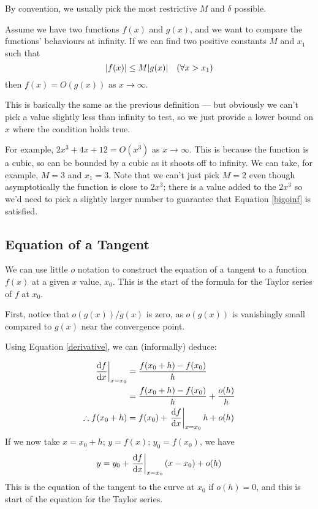 By convention, we usually pick the most restrictive \(M\) and \(\delta\) possible.

\begin{definition}
	Assume we have two functions \(f(x)\) and \(g(x)\), and we want to compare the functions' behaviours at infinity.
	If we can find two positive constants \(M\) and \(x_1\) such that
	\begin{equation}\label{bigoinf}
		\abs{f(x)} \leq M\abs{g(x)} \quad(\forall x > x_1)
	\end{equation}
	then \(f(x) = O(g(x))\) as \(x \to \infty\).
\end{definition}

This is basically the same as the previous definition --- but obviously we can't pick a value slightly less than infinity to test, so we just provide a lower bound on \(x\) where the condition holds true.

For example, \(2x^3 + 4x + 12 = O(x^3)\) as \(x \to \infty\).
This is because the function is a cubic, so can be bounded by a cubic as it shoots off to infinity.
We can take, for example, \(M = 3\) and \(x_1 = 3\).
Note that we can't just pick \(M=2\) even though asymptotically the function is close to \(2x^3\); there is a value added to the \(2x^3\) so we'd need to pick a slightly larger number to guarantee that Equation \eqref{bigoinf} is satisfied.

\subsection{Equation of a Tangent}
We can use little \(o\) notation to construct the equation of a tangent to a function \(f(x)\) at a given \(x\) value, \(x_0\).
This is the start of the formula for the Taylor series of \(f\) at \(x_0\).

First, notice that \(o(g(x))/g(x)\) is zero, as \(o(g(x))\) is vanishingly small compared to \(g(x)\) near the convergence point.

Using Equation \eqref{derivative}, we can (informally) deduce:

\begin{align*}
	\eval{\frac{\dd{f}}{\dd{x}}}_{x=x_0} & = \frac{f(x_0 + h) - f(x_0)}{h}                          \\
	                                     & = \frac{f(x_0 + h) - f(x_0)}{h} + \frac{o(h)}{h}         \\
	\therefore f(x_0 + h)                & = f(x_0) + \eval{\frac{\dd{f}}{\dd{x}}}_{x=x_0} h + o(h)
\end{align*}
If we now take \(x=x_0+h;\,y=f(x);\,y_0=f(x_0)\), we have
\[
	y = y_0 + \eval{\frac{\dd{f}}{\dd{x}}}_{x=x_0}(x - x_0) + o(h)
\]
This is the equation of the tangent to the curve at \(x_0\) if \(o(h)=0\), and this is start of the equation for the Taylor series.

